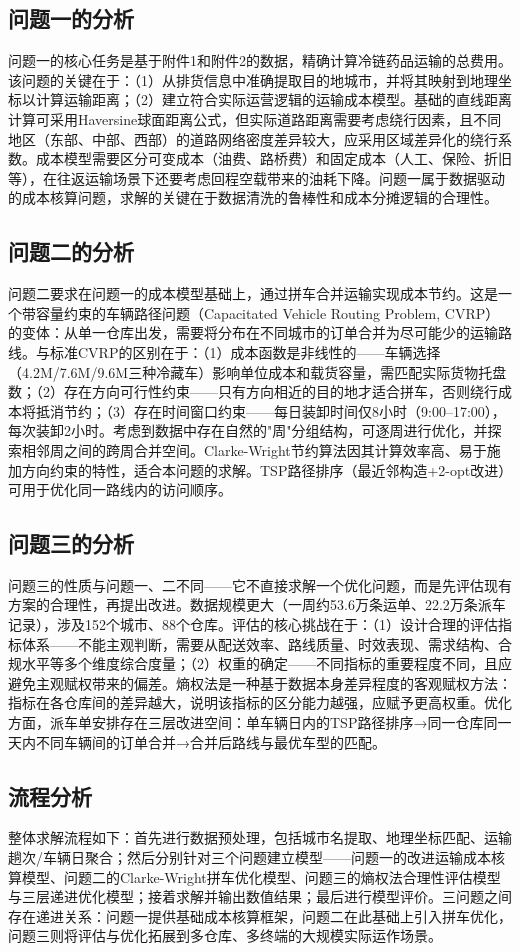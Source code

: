 \subsection{问题一的分析}

问题一的核心任务是基于附件1和附件2的数据，精确计算冷链药品运输的总费用。该问题的关键在于：（1）从排货信息中准确提取目的地城市，并将其映射到地理坐标以计算运输距离；（2）建立符合实际运营逻辑的运输成本模型。基础的直线距离计算可采用Haversine球面距离公式，但实际道路距离需要考虑绕行因素，且不同地区（东部、中部、西部）的道路网络密度差异较大，应采用区域差异化的绕行系数。成本模型需要区分可变成本（油费、路桥费）和固定成本（人工、保险、折旧等），在往返运输场景下还要考虑回程空载带来的油耗下降。问题一属于数据驱动的成本核算问题，求解的关键在于数据清洗的鲁棒性和成本分摊逻辑的合理性。

\subsection{问题二的分析}

问题二要求在问题一的成本模型基础上，通过拼车合并运输实现成本节约。这是一个带容量约束的车辆路径问题（Capacitated Vehicle Routing Problem, CVRP）的变体：从单一仓库出发，需要将分布在不同城市的订单合并为尽可能少的运输路线。与标准CVRP的区别在于：（1）成本函数是非线性的——车辆选择（4.2M/7.6M/9.6M三种冷藏车）影响单位成本和载货容量，需匹配实际货物托盘数；（2）存在方向可行性约束——只有方向相近的目的地才适合拼车，否则绕行成本将抵消节约；（3）存在时间窗口约束——每日装卸时间仅8小时（9:00–17:00），每次装卸2小时。考虑到数据中存在自然的"周"分组结构，可逐周进行优化，并探索相邻周之间的跨周合并空间。Clarke-Wright节约算法因其计算效率高、易于施加方向约束的特性，适合本问题的求解。TSP路径排序（最近邻构造+2-opt改进）可用于优化同一路线内的访问顺序。

\subsection{问题三的分析}

问题三的性质与问题一、二不同——它不直接求解一个优化问题，而是先评估现有方案的合理性，再提出改进。数据规模更大（一周约53.6万条运单、22.2万条派车记录），涉及152个城市、88个仓库。评估的核心挑战在于：（1）设计合理的评估指标体系——不能主观判断，需要从配送效率、路线质量、时效表现、需求结构、合规水平等多个维度综合度量；（2）权重的确定——不同指标的重要程度不同，且应避免主观赋权带来的偏差。熵权法是一种基于数据本身差异程度的客观赋权方法：指标在各仓库间的差异越大，说明该指标的区分能力越强，应赋予更高权重。优化方面，派车单安排存在三层改进空间：单车辆日内的TSP路径排序→同一仓库同一天内不同车辆间的订单合并→合并后路线与最优车型的匹配。

\subsection{流程分析}

整体求解流程如下：首先进行数据预处理，包括城市名提取、地理坐标匹配、运输趟次/车辆日聚合；然后分别针对三个问题建立模型——问题一的改进运输成本核算模型、问题二的Clarke-Wright拼车优化模型、问题三的熵权法合理性评估模型与三层递进优化模型；接着求解并输出数值结果；最后进行模型评价。三问题之间存在递进关系：问题一提供基础成本核算框架，问题二在此基础上引入拼车优化，问题三则将评估与优化拓展到多仓库、多终端的大规模实际运作场景。
